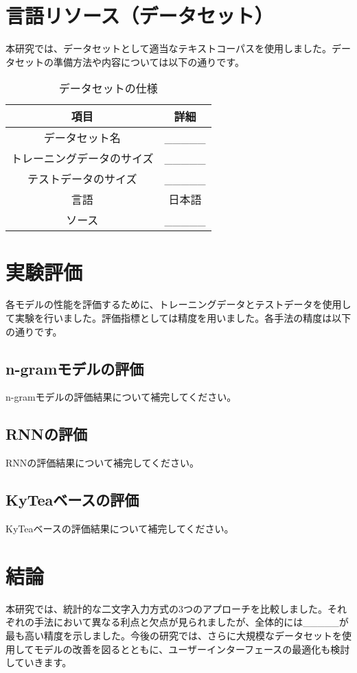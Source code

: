\documentclass[12pt]{article}
\begin{document}
\section{言語リソース（データセット）}
本研究では、データセットとして適当なテキストコーパスを使用しました。データセットの準備方法や内容については以下の通りです。

\begin{table}[h]
\centering
\begin{tabular}{|c|c|}
\hline
項目 & 詳細 \\
\hline
データセット名 & \_\_\_\_\_ \\
トレーニングデータのサイズ & \_\_\_\_\_ \\
テストデータのサイズ & \_\_\_\_\_ \\
言語 & 日本語 \\
ソース & \_\_\_\_\_ \\
\hline
\end{tabular}
\caption{データセットの仕様}
\end{table}

\section{実験評価}
各モデルの性能を評価するために、トレーニングデータとテストデータを使用して実験を行いました。評価指標としては精度を用いました。各手法の精度は以下の通りです。

\subsection{n-gramモデルの評価}
n-gramモデルの評価結果について補完してください。

\subsection{RNNの評価}
RNNの評価結果について補完してください。

\subsection{KyTeaベースの評価}
KyTeaベースの評価結果について補完してください。

\section{結論}
本研究では、統計的な二文字入力方式の3つのアプローチを比較しました。それぞれの手法において異なる利点と欠点が見られましたが、全体的には\_\_\_\_\_が最も高い精度を示しました。今後の研究では、さらに大規模なデータセットを使用してモデルの改善を図るとともに、ユーザーインターフェースの最適化も検討していきます。
\end{document}
